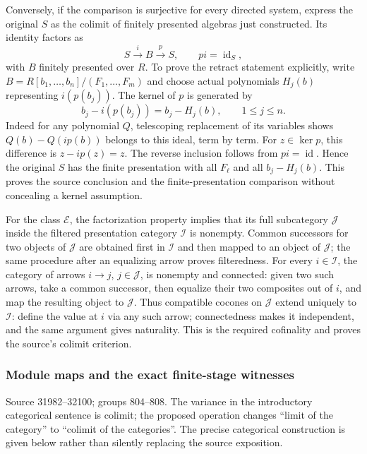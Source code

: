 Conversely, if the comparison is surjective for every directed system, express the original \(S\) as the colimit of finitely presented algebras just constructed. Its identity factors as \[
S\xrightarrow{i}B\xrightarrow{p}S,\qquad pi=\operatorname{id}_S,
\] with \(B\) finitely presented over \(R\). To prove the retract statement explicitly, write \(B=R[b_1,\ldots,b_n]/(F_1,\ldots,F_m)\) and choose actual polynomials \(H_j(b)\) representing \(i(p(b_j))\). The kernel of \(p\) is generated by \[
b_j-i(p(b_j))=b_j-H_j(b),\qquad 1\le j\le n.
\] Indeed for any polynomial \(Q\), telescoping replacement of its variables shows \(Q(b)-Q(i p(b))\) belongs to this ideal, term by term. For \(z\in\ker p\), this difference is \(z-i p(z)=z\). The reverse inclusion follows from \(pi=\operatorname{id}\). Hence the original \(S\) has the finite presentation with all \(F_\ell\) and all \(b_j-H_j(b)\). This proves the source conclusion and the finite-presentation comparison without concealing a kernel assumption.

For the class \(\mathcal E\), the factorization property implies that its full subcategory \(\mathcal J\) inside the filtered presentation category \(\mathcal I\) is nonempty. Common successors for two objects of \(\mathcal J\) are obtained first in \(\mathcal I\) and then mapped to an object of \(\mathcal J\); the same procedure after an equalizing arrow proves filteredness. For every \(i\in\mathcal I\), the category of arrows \(i\to j\), \(j\in\mathcal J\), is nonempty and connected: given two such arrows, take a common successor, then equalize their two composites out of \(i\), and map the resulting object to \(\mathcal J\). Thus compatible cocones on \(\mathcal J\) extend uniquely to \(\mathcal I\): define the value at \(i\) via any such arrow; connectedness makes it independent, and the same argument gives naturality. This is the required cofinality and proves the source's colimit criterion.

\subsubsection{Module maps and the exact finite-stage witnesses}\label{algebra-proof-036-module-maps-and-the-exact-finite-stage-witnesses}

Source 31982--32100; groups 804--808. The variance in the introductory categorical sentence is colimit; the proposed operation changes ``limit of the category'' to ``colimit of the categories''. The precise categorical construction is given below rather than silently replacing the source exposition.

